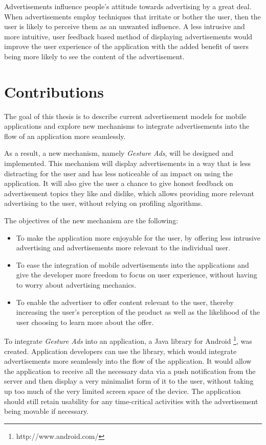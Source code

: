 Advertisements influence people's attitude towards advertising by a great deal. When advertisements employ techniques that irritate or bother the user, then the user is likely to perceive them as an unwanted influence.\cite{chowdhury2010consumer} A less intrusive and more intuitive, user feedback based method of displaying advertisements would improve the user experience of the application with the added benefit of users being more likely to see the content of the advertisement.

\section{Contributions}
The goal of this thesis is to describe current advertisement models for mobile applications and explore new mechanisms to integrate advertisements into the flow of an application more seamlessly.

As a result, a new mechanism, namely \textit{Gesture Ads}, will be designed and implemented. This mechanism will display advertisements in a way that is less distracting for the user and has less noticeable of an impact on using the application. It will also give the user a chance to give honest feedback on advertisement topics they like and dislike, which allows providing more relevant advertising to the user, without relying on profiling algorithms.

The objectives of the new mechanism are the following:
\begin{itemize}
  \item To make the application more enjoyable for the user, by offering less intrusive advertising and advertisements more relevant to the individual user.
  \item To ease the integration of mobile advertisements into the applications and give the developer more freedom to focus on user experience, without having to worry about advertising mechanics.
  \item To enable the advertiser to offer content relevant to the user, thereby increasing the user's perception of the product as well as the likelihood of the user choosing to learn more about the offer.
\end{itemize}

To integrate \textit{Gesture Ads} into an application, a Java library for Android \footnote{http://www.android.com/}, was created. Application developers can use the library, which would integrate advertisements more seamlessly into the flow of the application. It would allow the application to receive all the necessary data via a push notification from the server and then display a very minimalist form of it to the user, without taking up too much of the very limited screen space of the device. The application should still retain usability for any time-critical activities with the advertisement being movable if necessary.


